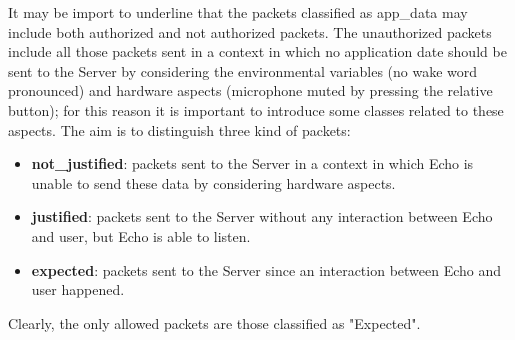 \documentclass[sigconf]{acmart}
\begin{document}
    It may be import to underline that the packets classified as app\_data may include both authorized and not authorized packets.
    The unauthorized packets include all those packets sent in a context in which no application date should be sent to the Server by considering the environmental variables (no wake word pronounced) and hardware aspects (microphone muted by pressing the relative button); for this reason it is important to introduce some classes related to these aspects.
    The aim is to distinguish three kind of packets:
    \begin{itemize}
        \item \textbf{not\_justified}: packets sent to the Server in a context in which Echo is unable to send these data by considering hardware aspects.
        \item \textbf{justified}: packets sent to the Server without any interaction between Echo and user, but Echo is able to listen.
        \item \textbf{expected}: packets sent to the Server since an interaction between Echo and user happened.
    \end{itemize}
    Clearly, the only allowed packets are those classified as "Expected".
\end{document}
